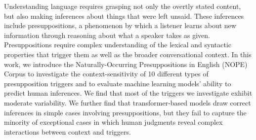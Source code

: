 Understanding language requires grasping not only the overtly stated content, but also making inferences about things that were left unsaid. These inferences include presuppositions, a phenomenon by which a listener learns about new information through reasoning about what a speaker takes as given. Presuppositions require complex understanding of the lexical and syntactic properties that trigger them as well as the broader conversational context. In this work, we introduce the Naturally-Occurring Presuppositions in English (NOPE) Corpus to investigate the context-sensitivity of 10 different types of presupposition triggers and to evaluate machine learning models' ability to predict human inferences. We find that most of the triggers we investigate exhibit moderate variability. We further find that transformer-based models draw correct inferences in simple cases involving presuppositions, but they fail to capture the minority of exceptional cases in which human judgments reveal complex interactions between context and triggers.
